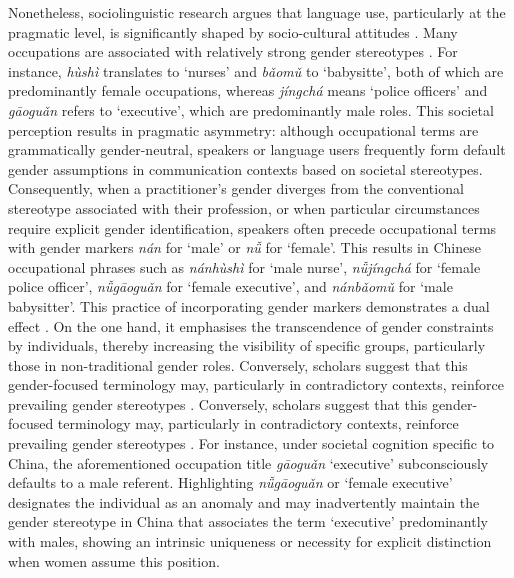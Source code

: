 \documentclass[11pt]{article}
\newcommand{\zh}[1]{\simplifiedchinesefont{#1}\rmfamily}
\begin{document}
Nonetheless, sociolinguistic research argues that language use, particularly at the pragmatic level, is significantly shaped by socio-cultural attitudes \citep{labov_1972_sociolinguistic}. Many occupations are associated with relatively strong gender stereotypes \citep{sun_1997_language,su_2021_occupational}. For instance, \zh{护士} \textit{hùshì} translates to `nurses' and \zh{保姆} \textit{bǎomǔ} to `babysitte', both of which are predominantly female occupations, whereas \zh{警察} \textit{jíngchá} means `police officers' and \zh{高管} \textit{gāoguǎn} refers to `executive', which are predominantly male roles. This societal perception results in pragmatic asymmetry: although occupational terms are grammatically gender-neutral, speakers or language users frequently form default gender assumptions in communication contexts based on societal stereotypes. Consequently, when a practitioner's gender diverges from the conventional stereotype associated with their profession, or when particular circumstances require explicit gender identification, speakers often precede occupational terms with gender markers \zh{男} \textit{nán} for `male' or \zh{女} \textit{nǚ} for `female'. This results in Chinese occupational phrases such as \zh{男护士} \textit{nánhùshì} for `male nurse', \zh{女警察} \textit{nǚjíngchá} for `female police officer', \zh{女高管} \textit{nǚgāoguǎn} for `female executive', and \zh{男保姆} \textit{nánbǎomǔ} for `male babysitter'. This practice of incorporating gender markers demonstrates a dual effect \citep{sun_1997_language,gustafssonsenden_2015_introducing,su_2021_occupational}. On the one hand, it emphasises the transcendence of gender constraints by individuals, thereby increasing the visibility of specific groups, particularly those in non-traditional gender roles. Conversely, scholars suggest that this gender-focused terminology may, particularly in contradictory contexts, reinforce prevailing gender stereotypes \citep{sun_1997_language}. Conversely, scholars suggest that this gender-focused terminology may, particularly in contradictory contexts, reinforce prevailing gender stereotypes \citep{sun_1997_language,gustafssonsenden_2015_introducing}. For instance, under societal cognition specific to China, the aforementioned occupation title \zh{高管} \textit{gāoguǎn} `executive' subconsciously defaults to a male referent. Highlighting \zh{女高管} \textit{nǚgāoguǎn} or `female executive' designates the individual as an anomaly and may inadvertently maintain the gender stereotype in China that associates the term `executive' predominantly with males, showing an intrinsic uniqueness or necessity for explicit distinction when women assume this position.
\end{document}
